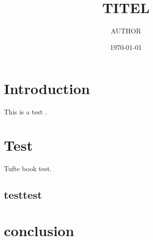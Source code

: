 \documentclass[nobib]{tufte-book}
\title{TITEL}
\author{AUTHOR}
\date{\today}
\begin{document}
\maketitle

\section{Introduction}
This is a test \cite{Bringhurst2005}.
\section{Test}
Tufte\cite{Tufte1997,Bringhurst2005} book test.
\subsection{testtest}
\section{conclusion}

\printbibliography

\printnomenclature[3cm]
\printindex
\end{document}
